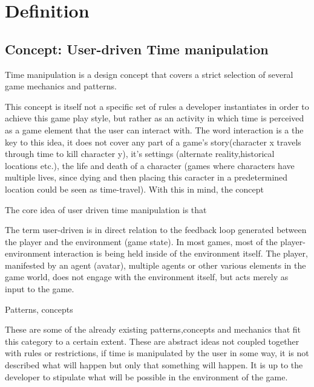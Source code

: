 \chapter{Definition}


\section{Concept: User-driven Time manipulation}


Time manipulation is a design concept that covers a strict selection of several game mechanics and patterns. 

This concept is itself not a specific set of rules a developer instantiates in order to achieve this game play style, 
but rather as an activity in which time is perceived as a game element that the user can interact with. 
The word interaction is a the key to this idea, it does not cover any part of a game's story(character x travels through time to kill character y),
 it's settings (alternate reality,historical locations etc.), the life and death of a character (games where characters have multiple lives,
 since dying and then placing this caracter in a predetermined location could be seen as time-travel). With this in mind, the concept 



The core idea of user driven time manipulation is that 

The term user-driven is in direct relation to the feedback loop generated between the player and the environment (game state).
 In most games, most of the player-environment interaction is being held inside of the environment itself. The player, manifested by an agent (avatar), multiple agents or other various elements in the game world, does not engage with the environment itself, but acts merely as input to the game. 

Patterns, concepts

These are some of the already existing patterns,concepts and mechanics that fit this category to a certain extent. 
These are abstract ideas not coupled together with rules or restrictions, if time is manipulated by the user in some way, it is not described 
what will happen but only that something will happen. It is up to the developer to stipulate what will be possible in the environment of the game. 

